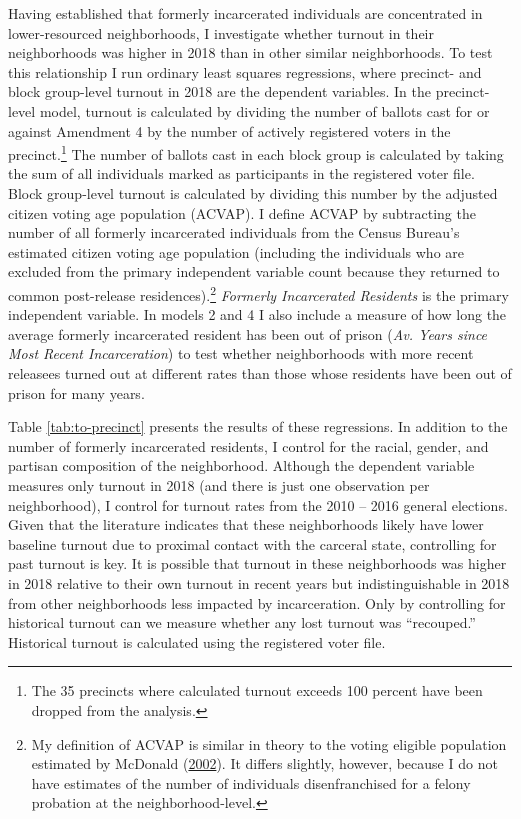 \documentclass[
  12pt,
]{article}
\begin{document}
Having established that formerly incarcerated individuals are concentrated in lower-resourced neighborhoods, I investigate whether turnout in their neighborhoods was higher in 2018 than in other similar neighborhoods. To test this relationship I run ordinary least squares regressions, where precinct- and block group-level turnout in 2018 are the dependent variables. In the precinct-level model, turnout is calculated by dividing the number of ballots cast for or against Amendment 4 by the number of actively registered voters in the precinct.\footnote{The 35 precincts where calculated turnout exceeds 100 percent have been dropped from the analysis.} The number of ballots cast in each block group is calculated by taking the sum of all individuals marked as participants in the registered voter file. Block group-level turnout is calculated by dividing this number by the adjusted citizen voting age population (ACVAP). I define ACVAP by subtracting the number of all formerly incarcerated individuals from the Census Bureau's estimated citizen voting age population (including the individuals who are excluded from the primary independent variable count because they returned to common post-release residences).\footnote{My definition of ACVAP is similar in theory to the voting eligible population estimated by McDonald (\protect\hyperlink{ref-McDonald2002}{2002}). It differs slightly, however, because I do not have estimates of the number of individuals disenfranchised for a felony probation at the neighborhood-level.} \emph{Formerly Incarcerated Residents} is the primary independent variable. In models 2 and 4 I also include a measure of how long the average formerly incarcerated resident has been out of prison (\emph{Av. Years since Most Recent Incarceration}) to test whether neighborhoods with more recent releasees turned out at different rates than those whose residents have been out of prison for many years.

Table \ref{tab:to-precinct} presents the results of these regressions. In addition to the number of formerly incarcerated residents, I control for the racial, gender, and partisan composition of the neighborhood. Although the dependent variable measures only turnout in 2018 (and there is just one observation per neighborhood), I control for turnout rates from the 2010 -- 2016 general elections. Given that the literature indicates that these neighborhoods likely have lower baseline turnout due to proximal contact with the carceral state, controlling for past turnout is key. It is possible that turnout in these neighborhoods was higher in 2018 relative to their own turnout in recent years but indistinguishable in 2018 from other neighborhoods less impacted by incarceration. Only by controlling for historical turnout can we measure whether any lost turnout was ``recouped.'' Historical turnout is calculated using the registered voter file.
\end{document}
